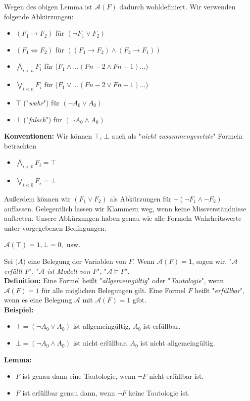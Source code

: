 \documentclass{scrartcl}
\begin{document}
Wegen des obigen Lemma ist $\mathcal{A}(F)$ dadurch wohldefiniert. Wir verwenden folgende Abk\"urzungen:
\begin{itemize}
\item $(F_1 \rightarrow F_2)$ f\"ur $(\neg F_1 \vee F_2)$
\item $(F_1 \Leftrightarrow F_2)$ f\"ur $((F_1 \rightarrow F_2) \wedge (F_2 \rightarrow F_1))$
\item $\bigwedge_{i < n}{F_i}$ f\"ur ($F_1 \wedge ... (F{n-2} \wedge F{n-1}) ... )$
\item $\bigvee_{i < n}{F_i}$ f\"ur ($F_1 \vee ... (F{n-2} \vee F{n-1}) ... )$
\item $\top$ ("\textit{wahr}") f\"ur $(\neg A_0 \vee A_0)$
\item $\bot$ ("\textit{falsch}") f\"ur $(\neg A_0 \wedge A_0)$
\end{itemize}
\textbf{Konventionen:} Wir k\"onnen $\top$, $\bot$ auch als "\textit{nicht zusammengesetzte}" Formeln betrachten
\begin{itemize}
\item $\bigwedge\limits_{i < 0}{F_i} = \top$
\item $\bigvee\limits_{i < 0}{F_i} = \bot$
\end{itemize}
Au{\ss}erdem k\"onnen wir $(F_1 \vee F_2)$ als Abk\"urzungen f\"ur $\neg(\neg F_1 \wedge \neg F_2)$ auffassen. Gelegentlich lassen wir Klammern weg, wenn keine Missverst\"andnisse auftreten. Unsere Abk\"urzungen haben genau wie alle Formeln Wahrheitswerte unter vorgegebenen Bedingungen.\\
\begin{center}
$\mathcal{A}(\top) = 1, \mathcal{\bot} = 0,$ usw.
\end{center}
Sei $\mathcal(A)$ eine Belegung der Variablen von $F$. Wenn $\mathcal{A}(F) = 1$, sagen wir, "\textit{$\mathcal{A}$ erf\"ullt $F$}", "\textit{$\mathcal{A}$ ist Modell von $F$}", "\textit{$\mathcal{A} \models F$}".\\
\textbf{Definition:} Eine Formel hei{\ss}t "\textit{allgemeing\"ultig}" oder "\textit{Tautologie}", wenn $\mathcal{A}(F) = 1$ f\"ur alle m\"oglichen Belegungen gilt. Eine Formel $F$ hei{\ss}t "\textit{erf\"ullbar}", wenn es eine Belegung $\mathcal{A}$ mit $\mathcal{A}(F) = 1$ gibt.\\
\textbf{Beispiel:}
\begin{itemize}
\item $\top = (\neg A_0 \vee A_0)$ ist allgemeing\"ultig, $A_0$ ist erf\"ullbar.
\item $\bot = (\neg A_0 \wedge A_0)$ ist nicht erf\"ullbar. $A_0$ ist nicht allgemeing\"ultig.
\end{itemize}
\textbf{Lemma:} 
\begin{itemize}
\item $F$ ist genau dann eine Tautologie, wenn $\neg F$ nicht erf\"ullbar ist.
\item $F$ ist erf\"ullbar genau dann, wenn $\neg F$ keine Tautologie ist.
\end{itemize}
\end{document}
